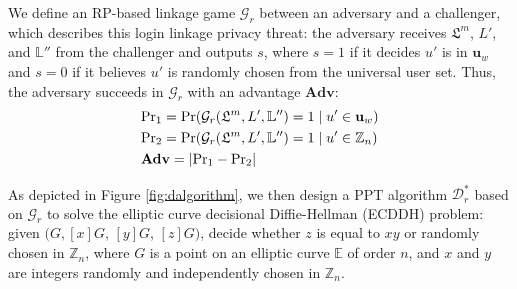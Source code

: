 We define an RP-based linkage game $\mathcal{G}_r$ between an adversary and a challenger, which describes this login linkage privacy threat: the adversary receives $\mathfrak{L}^m$, $L'$, and $\mathbb{L}''$ from the challenger and outputs $s$, where $s = 1$ if it decides $u'$ is in $\mathbf{u}_w$ %
and $s=0$ if it believes $u'$ is randomly chosen from the universal user set.
Thus, the adversary succeeds in $\mathcal{G}_r$ with an advantage $\mathbf{Adv}$:
\begin{align*}
&{\rm Pr}_1={\rm Pr}(\mathcal{G}_r(\mathfrak{L}^m, L', \mathbb{L}'')=1 \;| \; u' \in \mathbf{u}_w)  \\
&{\rm Pr}_2={\rm Pr}(\mathcal{G}_r(\mathfrak{L}^m, L', \mathbb{L}'')=1 \; | \; u' \in \mathbb{Z}_n)\\
&{\mathbf{Adv}}=|{\rm Pr}_1-{\rm Pr}_2|
\end{align*}

As depicted in Figure \ref{fig:dalgorithm}, we then design a PPT algorithm $\mathcal{D}^*_r$ based on $\mathcal{G}_r$ to solve the elliptic curve decisional Diffie-Hellman (ECDDH) problem: given $(G, [x]G$, $[y]G$, $[z]G)$, decide whether $z$ is equal to $xy$ or randomly chosen in $\mathbb{Z}_n$, where $G$ is a point on an elliptic curve $\mathbb{E}$ of order $n$, and $x$ and $y$ are integers randomly and independently chosen in $\mathbb{Z}_n$.


